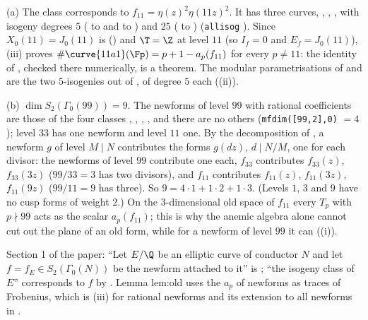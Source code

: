 \begin{example}\label{ex:moddeg:class-11a}
(a) The class  corresponds to $f_{11}=\eta(z)^2\eta(11z)^2$. It has three curves, , , , with isogeny degrees $5$ ( to 
and to ) and $25$ ( to ) (\texttt{allisog} \cite{ecdata}). Since $X_0(11)=J_0(11)$ is  () and $\T=\Z$ at level $11$ (so
$I_f=0$ and $E_f=J_0(11)$), (iii) proves $\#\curve{11a1}(\Fp)=p+1-a_p(f_{11})$ for every $p\ne11$: the identity of , checked
there numerically, is a theorem. The modular parametrisations of  and  are the two $5$-isogenies out of , of degree $5$ each
((ii)).

(b) $\dim S_2(\Gamma_0(99))=9$. The newforms of level $99$ with rational coefficients are those of the four classes , , , , and there
are no others (\texttt{mfdim([99,2],0)} $=4$); level $33$ has one newform and level $11$ one. By the decomposition of , a newform $g$ of level $M\mid N$ contributes the
forms $g(dz)$, $d\mid N/M$, one for each divisor: the newforms of level $99$ contribute one each, $f_{33}$ contributes $f_{33}(z)$, $f_{33}(3z)$ ($99/33=3$ has two divisors), and $f_{11}$
contributes $f_{11}(z)$, $f_{11}(3z)$, $f_{11}(9z)$ ($99/11=9$ has three). So $9=4\cdot1+1\cdot2+1\cdot3$. (Levels $1$, $3$ and $9$ have no cusp forms of weight $2$.) On the
$3$-dimensional old space of $f_{11}$ every $T_p$ with $p\nmid99$ acts as the scalar $a_p(f_{11})$; this is why the anemic algebra alone cannot cut out the plane of an old form,
while for a newform of level $99$ it can ((i)).
\end{example}

\begin{paperlink}\label{pl:moddeg:modularity}
Section 1 of the paper: ``Let $E/\Q$ be an elliptic curve of conductor $N$ and let $f=f_E\in S_2(\Gamma_0(N))$ be the newform attached to it'' is
; ``the isogeny class of $E$'' corresponds to $f$ by . Lemma lem:old uses the $a_p$ of newforms as traces of
Frobenius, which is (iii) for rational newforms and its extension to all newforms in .
\end{paperlink}

